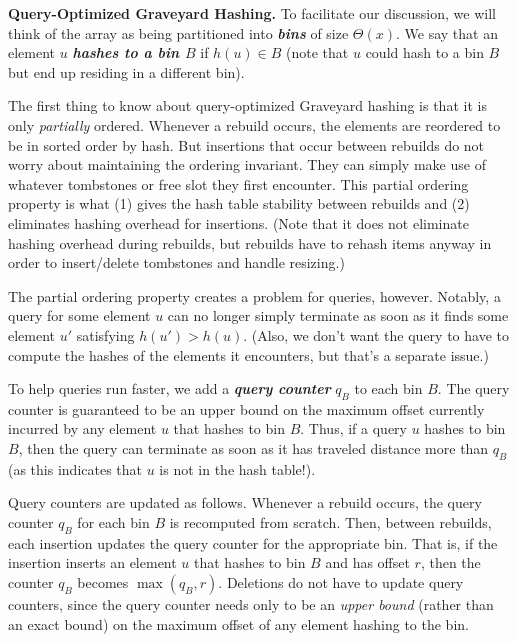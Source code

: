 \documentclass[10pt]{article}
\theoremstyle{remark}
\theoremstyle{remark}
\newcommand{\defn}[1]{\textbf{\emph{#1}}}
\renewcommand{\paragraph}[1]{\vspace{.2 cm} \noindent \textbf{#1}}
\begin{document}
\paragraph{Query-Optimized Graveyard Hashing.}
To facilitate our discussion, we will think of the array as being partitioned into \defn{bins} of size $\Theta(x)$. We say that an element $u$ \defn{hashes to a bin $B$} if $h(u) \in B$ (note that $u$ could hash to a bin $B$ but end up residing in a different bin). 

The first thing to know about query-optimized Graveyard hashing is that it is only \emph{partially} ordered. Whenever a rebuild occurs, the elements are reordered to be in sorted order by hash. But insertions that occur between rebuilds do not worry about maintaining the ordering invariant. They can simply make use of whatever tombstones or free slot they first encounter. This partial ordering property is what (1) gives the hash table stability between rebuilds and (2) eliminates hashing overhead for insertions. (Note that it does not eliminate hashing overhead during rebuilds, but rebuilds have to rehash items anyway in order to insert/delete tombstones and handle resizing.)

The partial ordering property creates a problem for queries, however. Notably, a query for some element $u$ can no longer simply terminate as soon as it finds some element $u'$ satisfying $h(u') > h(u)$. (Also, we don't want the query to have to compute the hashes of the elements it encounters, but that's a separate issue.)

To help queries run faster, we add a \defn{query counter} $q_B$ to each bin $B$. The query counter is guaranteed to be an upper bound on the maximum offset currently incurred by any element $u$ that hashes to bin $B$. Thus, if a query $u$ hashes to bin $B$, then the query can terminate as soon as it has traveled distance more than $q_B$ (as this indicates that $u$ is not in the hash table!). 

Query counters are updated as follows. Whenever a rebuild occurs, the query counter $q_B$ for each bin $B$ is recomputed from scratch. Then, between rebuilds, each insertion updates the query counter for the appropriate bin. That is, if the insertion inserts an element $u$ that hashes to bin $B$ and has offset $r$, then the counter $q_B$ becomes $\max(q_B, r)$. Deletions do not have to update query counters, since the query counter needs only to be an \emph{upper bound} (rather than an exact bound) on the maximum 
offset of any element hashing to the bin. 
\end{document}
